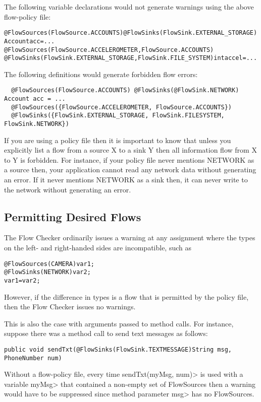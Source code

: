 The following variable declarations would not generate warnings using the above flow-policy file:
\begin{alltt}
  @FlowSources(FlowSource.ACCOUNTS) @FlowSinks(FlowSink.EXTERNAL_STORAGE) Account acc = ...
  @FlowSources({FlowSource.ACCELEROMETER, FlowSource.ACCOUNTS})
  @FlowSinks({FlowSink.EXTERNAL_STORAGE, FlowSink.FILE_SYSTEM}) int accel = ...
\end{alltt}

The following definitions would generate forbidden flow errors:
\begin{Verbatim}
  @FlowSources(FlowSource.ACCOUNTS) @FlowSinks(@FlowSink.NETWORK) Account acc = ...
  @FlowSources({FlowSource.ACCELEROMETER, FlowSource.ACCOUNTS})
  @FlowSinks({FlowSink.EXTERNAL_STORAGE, FlowSink.FILESYSTEM, FlowSink.NETWORK})
\end{Verbatim}

If you are using a policy file then it is important to know that unless
you explicitly list a flow from a source X to a sink Y then all
information flow from X to Y is forbidden.  For instance,
if  your policy file never mentions NETWORK as a source then, your application
cannot read any network data without generating an error.  If it never
mentions NETWORK as a sink then, it can never write to the network without
generating an error.



\subsection{Permitting Desired Flows}

The Flow Checker ordinarily issues a warning at any assignment where the types on the left- and right-handed sides are incompatible, such as
\begin{alltt}
@FlowSources(CAMERA) var1;
@FlowSinks(NETWORK) var2;
var1=var2;
\end{alltt}
However, if the difference in types is a flow that is permitted by the policy file, then the Flow Checker
issues no warnings.

This is also the case with arguments passed to method calls.  For instance, suppose there
was a method call to send text messages as follows:
\begin{Verbatim}
public void sendTxt(@FlowSinks(FlowSink.TEXTMESSAGE)String msg, PhoneNumber num)
\end{Verbatim}

Without a flow-policy file, every time \<sendTxt(myMsg, num)> is
used with a variable \<myMsg> that contained a non-empty set of
FlowSources then a warning would have to be suppressed since method
parameter \<msg> has no FlowSources.

